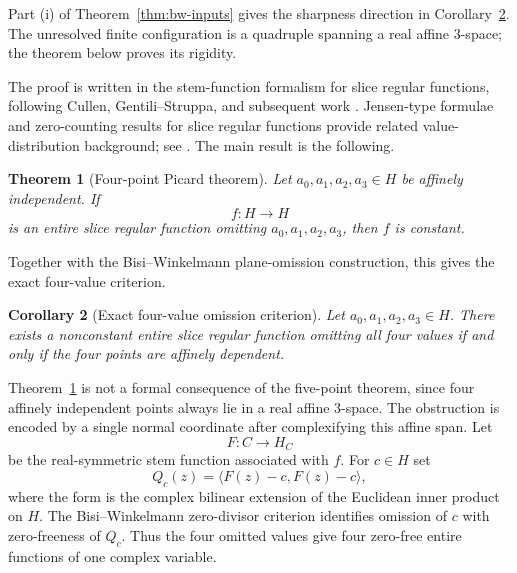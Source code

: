 \documentclass[11pt]{amsart}
\def\HH{H}%
\def\HHc{H_C}%
\def\CC{C}%
\numberwithin{equation}{section}
\newtheorem{theorem}{Theorem}[section]
\newtheorem{corollary}[theorem]{Corollary}
\theoremstyle{definition}
\theoremstyle{remark}
\newcommand{\HH}{\mathbb H}
\newcommand{\CC}{\mathbb C}
\newcommand{\HHc}{\mathbb H_{\mathbb C}}
\begin{document}
Part (i) of Theorem~\ref{thm:bw-inputs} gives the sharpness direction in Corollary~\ref{cor:exact-four-value}.  The unresolved finite configuration is a quadruple spanning a real affine $3$-space; the theorem below proves its rigidity.

The proof is written in the stem-function formalism for slice regular functions, following Cullen, Gentili--Struppa, and subsequent work \cite{Cullen1965Integral,GentiliStruppa2006Cullen,GentiliStruppa2007NewTheory,GentiliStoppato2008Zeros,GentiliStoppatoStruppa2013Regular,ColomboGentiliSabadiniStruppa2009Extension,ColomboSabadiniStruppa2011FunctionalCalculus,GhiloniPerotti2011Alternative}.  Jensen-type formulae and zero-counting results for slice regular functions provide related value-distribution background; see \cite{Perotti2020Jensen,BisiWinkelmann2020Harmonicity}.  The main result is the following.

\begin{theorem}[Four-point Picard theorem]\label{thm:main}
Let $a_0,a_1,a_2,a_3\in\HH$ be affinely independent. If
\[
f:\HH\to\HH
\]
is an entire slice regular function omitting $a_0,a_1,a_2,a_3$, then $f$ is constant.
\end{theorem}

Together with the Bisi--Winkelmann plane-omission construction, this gives the exact four-value criterion.

\begin{corollary}[Exact four-value omission criterion]\label{cor:exact-four-value}
Let $a_0,a_1,a_2,a_3\in\HH$. There exists a nonconstant entire slice regular function omitting all four values if and only if the four points are affinely dependent.
\end{corollary}

Theorem~\ref{thm:main} is not a formal consequence of the five-point theorem, since four affinely independent points always lie in a real affine $3$-space.  The obstruction is encoded by a single normal coordinate after complexifying this affine span.  Let
\[
F:\CC\to\HHc
\]
be the real-symmetric stem function associated with $f$.  For $c\in\HH$ set
\[
Q_c(z)=\langle F(z)-c,F(z)-c\rangle,
\]
where the form is the complex bilinear extension of the Euclidean inner product on $\HH$.  The Bisi--Winkelmann zero-divisor criterion identifies omission of $c$ with zero-freeness of $Q_c$.  Thus the four omitted values give four zero-free entire functions of one complex variable.
\end{document}
